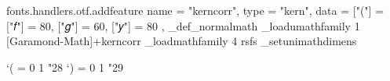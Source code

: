 
\directlua
  {fonts.handlers.otf.addfeature 
    {
    name = "kerncorr",
    type = "kern",
    data = {
    ["("] = { ["𝑓"] = 80, ["𝑔"] = 60, ["𝑦"] = 80 },
    }
  }
}
\_def\_normalmath{%
    \_loadumathfamily 1 {[Garamond-Math]}{+kerncorr} %
    \_loadmathfamily  4 rsfs              %
    \_setunimathdimens
}%
\normalmath %


\Umathcode `( = 0 1 "28
\Umathcode `) = 0 1 "29